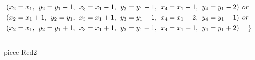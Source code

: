 \begin{align*}
&(x_{2} = x_{1},\hspace{1ex}y_{2} = y_{1}-1,\hspace{1ex}x_{3} = x_{1}-1, \hspace{1ex}y_{3} = y_{1}-1,\hspace{1ex}x_{4} = x_{1}-1,\hspace{1ex}y_{4} = y_{1}-2)\hspace{1ex} or\\
&(x_{2} = x_{1}+1,\hspace{1ex}y_{2} = y_{1},\hspace{1ex}x_{3} = x_{1}+1, \hspace{1ex}y_{3} = y_{1}-1,\hspace{1ex}x_{4} = x_{1}+2,\hspace{1ex}y_{4} = y_{1}-1)\hspace{1ex} or\\
&(x_{2} = x_{1},\hspace{1ex}y_{2} = y_{1}+1,\hspace{1ex}x_{3} = x_{1}+1, \hspace{1ex}y_{3} = y_{1}+1,\hspace{1ex}x_{4} = x_{1}+1,\hspace{1ex}y_{4} = y_{1}+2)\hspace{3ex} \} 
\end{align*}
\\ piece Red2 
